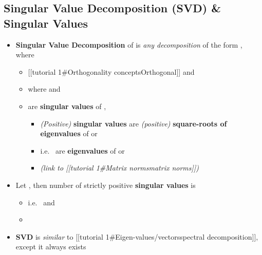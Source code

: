 \subsection*{Singular Value Decomposition (SVD) \& Singular
Values}

\begin{itemize}

\item
  \textbf{Singular Value Decomposition} of
   is \emph{any decomposition} of
  the form , where

  \begin{itemize}
  
  \item
    {[}{[}tutorial 1\#Orthogonality concepts\textbar Orthogonal{]}{]}
    and
  \item
    where  and
  \item
     are \textbf{singular values}
    of ,

    \begin{itemize}
    
    \item
      \emph{(Positive)} \textbf{singular values} are \emph{(positive)}
      \textbf{square-roots of eigenvalues} of  or
    \item
      i.e.~ are
      \textbf{eigenvalues} of  or 
    \item
       \emph{(link to
      {[}{[}tutorial 1\#Matrix norms\textbar matrix norms{]}{]})}
    \end{itemize}
  \end{itemize}
\item
  Let , then number of strictly positive
  \textbf{singular values} is 

  \begin{itemize}
  
  \item
    i.e.~ and
  \item
  \end{itemize}
\item
  \textbf{SVD} is \emph{similar} to {[}{[}tutorial
  1\#Eigen-values/vectors\textbar spectral decomposition{]}{]}, except
  it always exists


\end{itemize}
